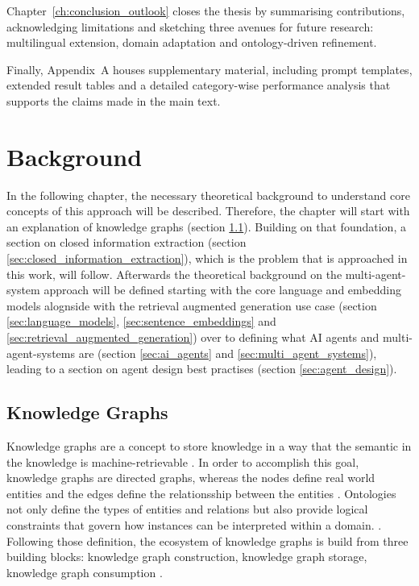 \documentclass[a4paper,oneside,bibliography=totoc]{scrbook}
\begin{document}
Chapter~\ref{ch:conclusion_outlook} closes the thesis by summarising contributions, acknowledging limitations and sketching three avenues for future research: multilingual extension, domain adaptation and ontology-driven refinement.

Finally, Appendix~A houses supplementary material, including prompt templates, extended result tables and a detailed category-wise performance analysis that supports the claims made in the main text.

\chapter{Background}
\label{ch:background}
In the following chapter, the necessary theoretical background to understand core concepts of this approach will be described. Therefore, the chapter will start with an explanation of knowledge graphs (section \ref{sec:knowledge_graphs}). Building on that foundation, a section on closed information extraction (section \ref{sec:closed_information_extraction}), which is the problem that is approached in this work, will follow. Afterwards the theoretical background on the multi-agent-system approach will be defined starting with the core language and embedding models alognside with the retrieval augmented generation use case (section \ref{sec:language_models}, \ref{sec:sentence_embeddings} and \ref{sec:retrieval_augmented_generation}) over to defining what \ac{AI} agents and multi-agent-systems are (section \ref{sec:ai_agents} and \ref{sec:multi_agent_systems}), leading to a section on agent design best practises (section \ref{sec:agent_design}).
\section{Knowledge Graphs}
\label{sec:knowledge_graphs}
Knowledge graphs are a concept to store knowledge in a way that the semantic in the knowledge is machine-retrievable \cite{GomezPerez2017}. In order to accomplish this goal, knowledge graphs are directed graphs, whereas the nodes define real world entities and the edges define the relationsship between the entities \cite{Paulheim2016}. Ontologies not only define the types of entities and relations but also provide logical constraints that govern how instances can be interpreted within a domain. \cite{GomezPerez2017,Paulheim2016}. Following those definition, the ecosystem of knowledge graphs is build from three building blocks: knowledge graph construction, knowledge graph storage, knowledge graph consumption \cite{GomezPerez2017}.
\end{document}
